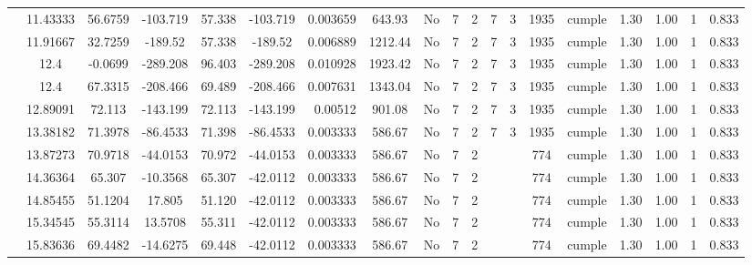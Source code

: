 \begin{table}[H]
{\begin{tabular}{|c|c|c|c|c|c|r|c|c|c|c|c|c|c|c|c|c|c|c|}
\cline{2-19}        & 11.43333 & 56.6759 & -103.719 & 57.338 & -103.719 & 0.003659 & 643.93 & No  & 7   & 2   & 7   & 3   & 1935 & \cellcolor[rgb]{ .776,  .937,  .808}cumple & 1.30 & 1.00 & 1   & 0.833 \bigstrut\\
\cline{2-19}        & 11.91667 & 32.7259 & -189.52 & 57.338 & -189.52 & 0.006889 & 1212.44 & No  & 7   & 2   & 7   & 3   & 1935 & \cellcolor[rgb]{ .776,  .937,  .808}cumple & 1.30 & 1.00 & 1   & 0.833 \bigstrut\\
\cline{2-19}        & \cellcolor[rgb]{ .851,  .882,  .949}12.4 & -0.0699 & -289.208 & 96.403 & -289.208 & 0.010928 & 1923.42 & No  & 7   & 2   & 7   & 3   & 1935 & \cellcolor[rgb]{ .776,  .937,  .808}cumple & 1.30 & 1.00 & 1   & 0.833 \bigstrut\\
\cline{2-19}        & \cellcolor[rgb]{ .851,  .882,  .949}12.4 & 67.3315 & -208.466 & 69.489 & -208.466 & 0.007631 & 1343.04 & No  & 7   & 2   & 7   & 3   & 1935 & \cellcolor[rgb]{ .776,  .937,  .808}cumple & 1.30 & 1.00 & 1   & 0.833 \bigstrut\\
\cline{2-19}        & 12.89091 & 72.113 & -143.199 & 72.113 & -143.199 & 0.00512 & 901.08 & No  & 7   & 2   & 7   & 3   & 1935 & \cellcolor[rgb]{ .776,  .937,  .808}cumple & 1.30 & 1.00 & 1   & 0.833 \bigstrut\\
\cline{2-19}        & 13.38182 & 71.3978 & -86.4533 & 71.398 & -86.4533 & 0.003333 & 586.67 & No  & 7   & 2   & 7   & 3   & 1935 & \cellcolor[rgb]{ .776,  .937,  .808}cumple & 1.30 & 1.00 & 1   & 0.833 \bigstrut\\
\cline{2-19}        & 13.87273 & 70.9718 & -44.0153 & 70.972 & -44.0153 & 0.003333 & 586.67 & No  & 7   & 2   &     &     & 774 & \cellcolor[rgb]{ .776,  .937,  .808}cumple & 1.30 & 1.00 & 1   & 0.833 \bigstrut\\
\cline{2-19}        & 14.36364 & 65.307 & -10.3568 & 65.307 & -42.0112 & 0.003333 & 586.67 & No  & 7   & 2   &     &     & 774 & \cellcolor[rgb]{ .776,  .937,  .808}cumple & 1.30 & 1.00 & 1   & 0.833 \bigstrut\\
\cline{2-19}        & 14.85455 & 51.1204 & 17.805 & 51.120 & -42.0112 & 0.003333 & 586.67 & No  & 7   & 2   &     &     & 774 & \cellcolor[rgb]{ .776,  .937,  .808}cumple & 1.30 & 1.00 & 1   & 0.833 \bigstrut\\
\cline{2-19}        & 15.34545 & 55.3114 & 13.5708 & 55.311 & -42.0112 & 0.003333 & 586.67 & No  & 7   & 2   &     &     & 774 & \cellcolor[rgb]{ .776,  .937,  .808}cumple & 1.30 & 1.00 & 1   & 0.833 \bigstrut\\
\cline{2-19}        & 15.83636 & 69.4482 & -14.6275 & 69.448 & -42.0112 & 0.003333 & 586.67 & No  & 7   & 2   &     &     & 774 & \cellcolor[rgb]{ .776,  .937,  .808}cumple & 1.30 & 1.00 & 1   & 0.833 \bigstrut\\

\end{tabular}}
\end{table}
